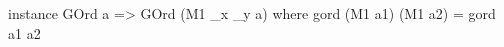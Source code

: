 \begin{code}
instance GOrd a => GOrd (M1 _x _y a) where
  gord (M1 a1) (M1 a2) = gord a1 a2
\end{code}
